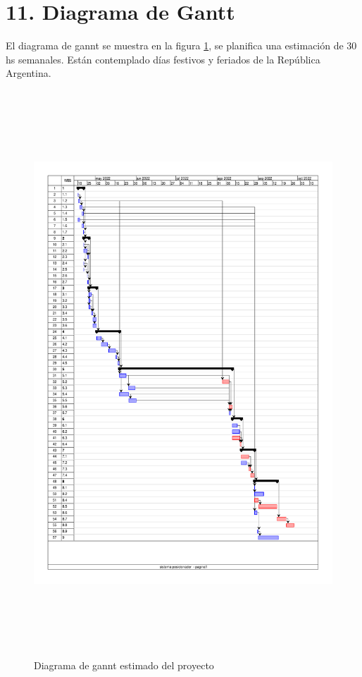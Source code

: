 \documentclass[11pt, %
codirector, %
]{charter}
\begin{document}
\section{11. Diagrama de Gantt}
\label{sec:gantt}
El diagrama de gannt se muestra en la figura \ref{fig:diaGANTT}, se planifica una estimación de 30 hs semanales. Están contemplado días festivos y feriados de la República Argentina. 


\begin{figure}[H]
	\includegraphics[width = \textwidth, height = 21.2cm,trim={0 3cm 0  0.1cm},clip ]{./Figuras/AonGantt/gannt_poss.pdf}
	\caption{Diagrama de gannt estimado del proyecto}
	\label{fig:diaGANTT}
\end{figure}
\end{document}
